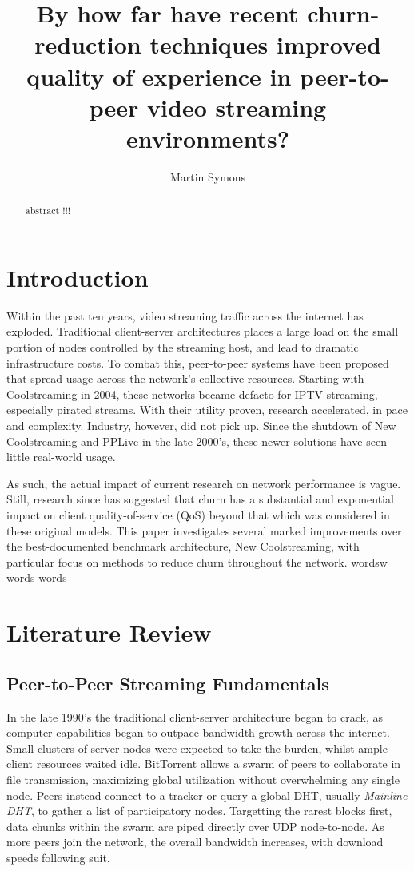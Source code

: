\documentclass[12pt,a4paper]{article}
\title{By how far have recent churn-reduction techniques improved quality of experience in peer-to-peer video streaming environments?}
\author{Martin Symons}
\begin{document}
\maketitle

\begin{abstract}
abstract !!! 
\end{abstract}

\section{Introduction}
Within the past ten years, video streaming traffic across the internet has exploded. Traditional client-server architectures places a large load on the small portion of nodes controlled by the streaming host, and lead to dramatic infrastructure costs. To combat this, peer-to-peer systems have been proposed that spread usage across the network's collective resources. Starting with Coolstreaming in 2004, these networks became defacto for IPTV streaming, especially pirated streams. With their utility proven, research accelerated, in pace and complexity. Industry, however, did not pick up. Since the shutdown of New Coolstreaming and PPLive in the late 2000's, these newer solutions have seen little real-world usage.

As such, the actual impact of current research on network performance is vague. Still, research since has suggested that churn has a substantial and exponential impact on client quality-of-service (QoS) beyond that which was considered in these original models. This paper investigates several marked improvements over the best-documented benchmark architecture, New Coolstreaming, with particular focus on methods to reduce churn throughout the network. wordsw words words 

\section{Literature Review}
\subsection{Peer-to-Peer Streaming Fundamentals}
In the late 1990's the traditional client-server architecture began to crack, as computer capabilities began to outpace bandwidth growth across the internet. Small clusters of server nodes were expected to take the burden, whilst ample client resources waited idle. BitTorrent allows a swarm of peers to collaborate in file transmission, maximizing global utilization without overwhelming any single node. Peers instead connect to a tracker or query a global DHT, usually \textit{Mainline DHT}, to gather a list of participatory nodes. Targetting the rarest blocks first, data chunks within the swarm are piped directly over UDP node-to-node. As more peers join the network, the overall bandwidth increases, with download speeds following suit.
\end{document}
